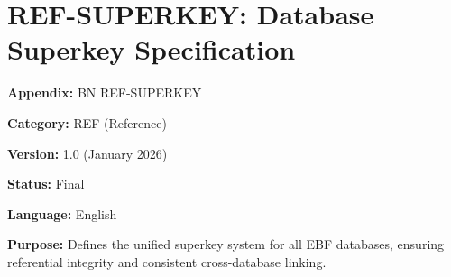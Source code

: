 %
%

%
%
%
%

\chapter{REF-SUPERKEY: Database Superkey Specification}
\label{app:superkey}



\begin{tcolorbox}[colback=blue!5!white, colframe=blue!75!black,
    title=Appendix Metadata]

\textbf{Appendix:} BN REF-SUPERKEY

\textbf{Category:} REF (Reference)

\textbf{Version:} 1.0 (January 2026)

\textbf{Status:} Final

\textbf{Language:} English

\textbf{Purpose:} Defines the unified superkey system for all EBF databases, ensuring referential integrity and consistent cross-database linking.

\end{tcolorbox}



